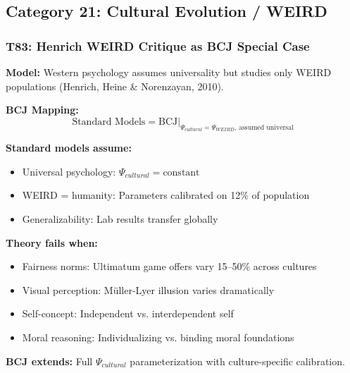 
\subsection{Category 21: Cultural Evolution / WEIRD}

\subsubsection*{T83: Henrich WEIRD Critique as BCJ Special Case}

\textbf{Model:} Western psychology assumes universality but studies only WEIRD populations (Henrich, Heine \& Norenzayan, 2010).

\textbf{BCJ Mapping:}
\begin{equation}
\text{Standard Models} = \text{BCJ} \big|_{\Psi_{cultural} = \Psi_{WEIRD}, \, \text{assumed universal}}
\end{equation}

\begin{tcolorbox}[colback=red!5!white, colframe=red!75!black,
    title=Boundary Condition: Where WEIRD-Based Models Fail]
\textbf{Standard models assume:}
\begin{itemize}[nosep]
\item Universal psychology: $\Psi_{cultural} = \text{constant}$
\item WEIRD = humanity: Parameters calibrated on 12\% of population
\item Generalizability: Lab results transfer globally
\end{itemize}

\textbf{Theory fails when:}
\begin{itemize}[nosep]
\item Fairness norms: Ultimatum game offers vary 15--50\% across cultures
\item Visual perception: Müller-Lyer illusion varies dramatically
\item Self-concept: Independent vs. interdependent self
\item Moral reasoning: Individualizing vs. binding moral foundations
\end{itemize}

\textbf{BCJ extends:} Full $\Psi_{cultural}$ parameterization with culture-specific calibration.
\end{tcolorbox}

